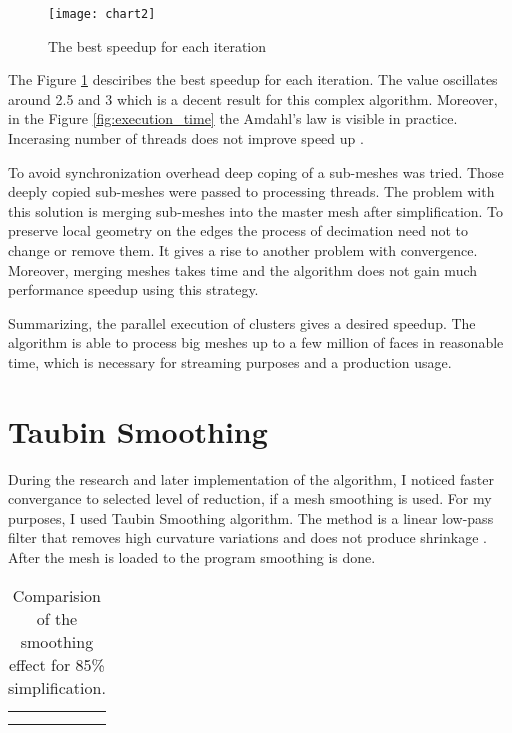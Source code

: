 \begin{figure}[H]
  \begin{center}
    \texttt{[image: chart2]}
    \caption{The best speedup for each iteration}
    \label{fig:speedup}
  \end{center}
\end{figure}

The Figure \ref{fig:speedup} desciribes the best speedup for each iteration. The value oscillates around 2.5 and 3 which is a decent result for this complex algorithm. Moreover, in the Figure \ref{fig:execution_time} the Amdahl's law is visible in practice. Incerasing number of threads does not improve speed up \cite{amdahl67}.

To avoid synchronization overhead deep coping of a sub-meshes was tried. Those deeply copied sub-meshes were passed to processing threads. The problem with this solution is merging sub-meshes into the master mesh after simplification. To preserve local geometry on the edges the process of decimation need not to change or remove them. It gives a rise to another problem with convergence. Moreover, merging meshes takes time and the algorithm does not gain much performance speedup using this strategy.

Summarizing, the parallel execution of clusters gives a desired speedup. The algorithm is able to process big meshes up to a few million of faces in reasonable time, which is necessary for streaming purposes and a production usage.

\newpage
\section{Taubin Smoothing}

During the research and later implementation of the algorithm, I noticed faster convergance to selected level of reduction, if a mesh smoothing is used. For my purposes, I used Taubin Smoothing algorithm. The method is a linear low-pass filter that removes high curvature variations and does not produce shrinkage \cite{taubin95}. After the mesh is loaded to the program smoothing is done.

\begin{center}
  	\begin{table}[h!]
  	\begin{center}
  	\begin{tabular}{cc}
	\begin{subfigure}{1\textwidth}\centering\includegraphics
		[width=0.8\columnwidth]{smooth}\caption{Simplification with smoothing}\label{smooth}\end{subfigure}\\
	\begin{subfigure}{1\textwidth}\centering\includegraphics
		[width=0.8\columnwidth]{non_smooth}\caption{Simplification without smoothing}\label{non_smooth}\end{subfigure}
	\end{tabular}
	\caption{Comparision of the smoothing effect for 85\% simplification.}
  	\label{tab:smoothing_effect}
  	\end{center}
	\end{table}
\end{center}

